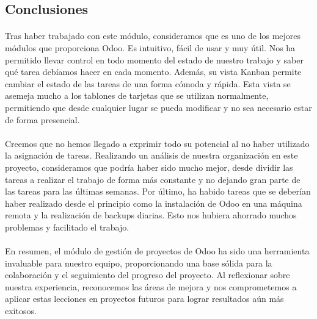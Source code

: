 \subsection{Conclusiones}
\paragraph{}
Tras haber trabajado con este módulo, consideramos que es uno de los mejores módulos que proporciona Odoo. Es intuitivo, fácil de usar y muy útil. Nos ha permitido llevar control en todo momento del estado de nuestro trabajo y saber qué tarea debíamos hacer en cada momento. Además, su vista Kanban permite cambiar el estado de las tareas de una forma cómoda y rápida. Esta vista se asemeja mucho a los tablones de tarjetas que se utilizan normalmente, permitiendo que desde cualquier lugar se pueda modificar y no sea necesario estar de forma presencial.
\paragraph{}
Creemos que no hemos llegado a exprimir todo su potencial al no haber utilizado la asignación de tareas. Realizando un análisis de nuestra organización en este proyecto, consideramos que podría haber sido mucho mejor, desde dividir las tareas a realizar el trabajo de forma más constante y no dejando gran parte de las tareas para las últimas semanas. Por último, ha habido tareas que se deberían haber realizado desde el principio como la instalación de Odoo en una máquina remota y la realización de backups diarias. Esto nos hubiera ahorrado muchos problemas y facilitado el trabajo.

\paragraph{}
En resumen, el módulo de gestión de proyectos de Odoo ha sido una herramienta invaluable para nuestro equipo, proporcionando una base sólida para la colaboración y el seguimiento del progreso del proyecto. Al reflexionar sobre nuestra experiencia, reconocemos las áreas de mejora y nos comprometemos a aplicar estas lecciones en proyectos futuros para lograr resultados aún más exitosos.
